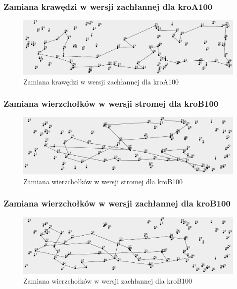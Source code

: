\documentclass[a4paper]{article}
\begin{document}
\subsubsection{Zamiana krawędzi w wersji zachłannej dla kroA100}

\begin{figure}[H]
\centering
\includegraphics[width=\textwidth]{lab2/kroA_greedy_corners}
\caption{Zamiana krawędzi w wersji zachłannej dla kroA100}
\end{figure}

\subsubsection{Zamiana wierzchołków w wersji stromej dla kroB100}

\begin{figure}[H]
\centering
\includegraphics[width=\textwidth]{lab2/kroB_steepest_points}
\caption{Zamiana wierzchołków w wersji stromej dla kroB100}
\end{figure}

\subsubsection{Zamiana wierzchołków w wersji zachłannej dla kroB100}

\begin{figure}[H]
\centering
\includegraphics[width=\textwidth]{lab2/kroB_greedy_points}
\caption{Zamiana wierzchołków w wersji zachłannej dla kroB100}
\end{figure}
\end{document}
